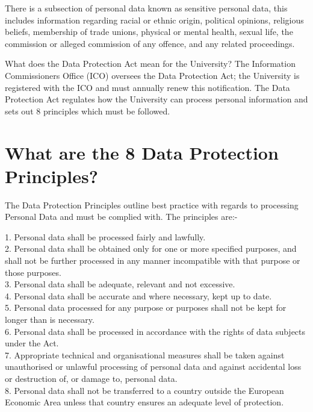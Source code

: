 \documentclass[12pt]{article}
\begin{document}
There is a subsection of personal data known as sensitive personal data, this includes information regarding racial or ethnic origin, political opinions, religious beliefs, membership of trade unions, physical or mental health, sexual life, the commission or alleged commission of any offence, and any related proceedings.

What does the Data Protection Act mean for the University?
The Information Commissioners Office (ICO) oversees the Data Protection Act; the University is registered with the ICO and must annually renew this notification.  The Data Protection Act regulates how the University can process personal information and sets out 8 principles which must be followed.

\section{What are the 8 Data Protection Principles?}
The Data Protection Principles outline best practice with regards to processing Personal Data and must be complied with. The principles are:-

1. Personal data shall be processed fairly and lawfully.\\

2. Personal data shall be obtained only for one or more specified purposes, and shall not be further processed in any manner incompatible with that purpose or those purposes.\\

3. Personal data shall be adequate, relevant and not excessive.\\

4. Personal data shall be accurate and where necessary, kept up to date.\\

5. Personal data processed for any purpose or purposes shall not be kept for longer than is necessary.\\

6. Personal data shall be processed in accordance with the rights of data subjects under the Act.\\

7. Appropriate technical and organisational measures shall be taken against unauthorised or unlawful processing of personal data and against accidental loss or destruction of, or damage to, personal data.\\

8. Personal data shall not be transferred to a country outside the European Economic Area unless that country ensures an adequate level of protection.\\
\end{document}
